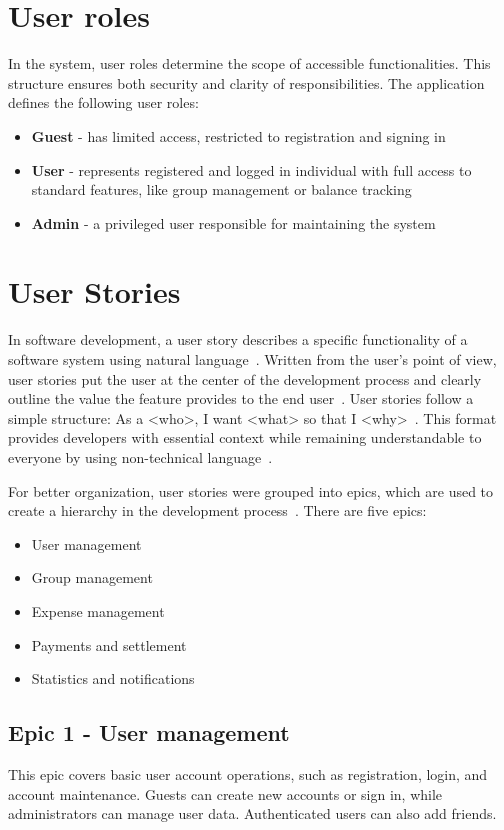 \documentclass{ctuthesis}
\begin{document}
\section{User roles}
In the system, user roles determine the scope of accessible functionalities. This structure ensures both security and clarity of responsibilities. The application defines the following user roles:
\begin{itemize}
    \item \textbf{Guest} - has limited access, restricted to registration and signing in
    \item \textbf{User} - represents registered and logged in individual with full access to standard features, like group management or balance tracking
    \item \textbf{Admin} - a privileged user responsible for maintaining the system
\end{itemize}

\section{User Stories}
In software development, a user story describes a specific functionality of a software system using natural language~\cite{US1}. Written from the user's point of view, user stories put the user at the center of the development process and clearly outline the value the feature provides to the end user~\cite{US2, US3}. User stories follow a simple structure: As a <who>, I want <what> so that I <why>~\cite{US4}. This format provides developers with essential context while remaining understandable to everyone by using non-technical language~\cite{US3}.

For better organization, user stories were grouped into epics, which are used to create a hierarchy in the development process~\cite{Epic}. There are five epics:

\begin{itemize}
    \item User management
    \item Group management
    \item Expense management
    \item Payments and settlement
    \item Statistics and notifications
\end{itemize}


\subsection{Epic 1 - User management}
This epic covers basic user account operations, such as registration, login, and account maintenance. Guests can create new accounts or sign in, while administrators can manage user data. Authenticated users can also add friends.
\end{document}

